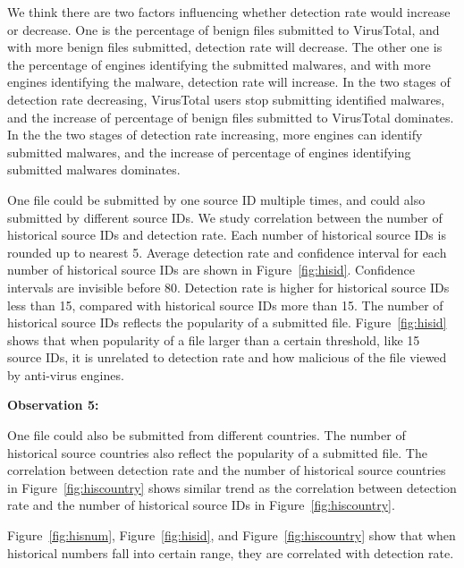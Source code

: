 We think there are two factors influencing whether detection rate would increase or decrease.
One is the percentage of benign files submitted to VirusTotal, 
and with more benign files submitted, detection rate will decrease.   
The other one is the percentage of engines identifying the submitted malwares, 
and with more engines identifying the malware, detection rate will increase. 
In the two stages of detection rate decreasing, 
VirusTotal users stop submitting identified malwares, 
and the increase of percentage of benign files submitted to VirusTotal dominates. 
In the the two stages of detection rate increasing, 
more engines can identify submitted malwares, 
and the increase of percentage of engines identifying submitted malwares dominates. 

One file could be submitted by one source ID multiple times, 
and could also submitted by different source IDs. 
We study correlation between the number of historical source IDs and detection rate. 
Each number of historical source IDs is rounded up to nearest 5. 
Average detection rate and confidence interval for each number of historical source IDs are shown in Figure~\ref{fig:hisid}. 
Confidence intervals are invisible before 80. 
Detection rate is higher for historical source IDs less than 15, compared with historical source IDs more than 15.
The number of historical source IDs reflects the popularity of a submitted file.
Figure~\ref{fig:hisid} shows that when popularity of a file larger than a certain threshold, like 15 source IDs, 
it is unrelated to detection rate and how malicious of the file viewed by anti-virus engines. 

{\bf Observation 5:} 
{\em }

One file could also be submitted from different countries. 
The number of historical source countries also reflect the popularity of a submitted file. 
The correlation between detection rate and the number of historical source countries in 
Figure~\ref{fig:hiscountry} shows similar trend as the correlation between detection rate 
and the number of historical source IDs in Figure~\ref{fig:hiscountry}. 

Figure~\ref{fig:hisnum}, Figure~\ref{fig:hisid}, and Figure~\ref{fig:hiscountry} show that 
when historical numbers fall into certain range, they are correlated with detection rate. 
\fi

